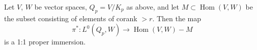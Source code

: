 Let $V$, $W$ be vector spaces, $Q_p = V/K_p$ as above, and let $M \subset \operatorname{Hom}(V, W)$ be the subset consisting of elements of corank $> r$. Then the map
$$\pi^*: L^0(Q_p, W) \to \operatorname{Hom}(V, W) - M$$
is a 1:1 proper immersion.
